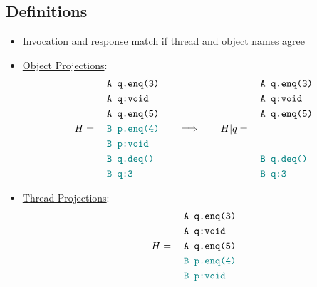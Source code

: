 \documentclass[twocolumn,landscape,10pt]{article}
\theoremstyle{definition}
\begin{document}
\subsection{Definitions}

\begin{itemize}
    \item Invocation and response \underline{match} if thread and object names
        agree
    \item \underline{Object Projections}:
        \[
            H = \quad\begin{align}
                &\texttt{A q.enq(3)} \\
                &\texttt{A q:void} \\
                &\texttt{A q.enq(5)} \\
                &\textcolor{teal}{\texttt{B p.enq(4)}} \\
                &\textcolor{teal}{\texttt{B p:void}} \\
                &\textcolor{teal}{\texttt{B q.deq()}} \\
                &\textcolor{teal}{\texttt{B q:3}} \\
            \end{align} 
            \qquad\Longrightarrow\qquad
            H|q = \quad\begin{align}
                &\texttt{A q.enq(3)} \\
                &\texttt{A q:void} \\
                &\texttt{A q.enq(5)} \\
                \\
                \\
                &\textcolor{teal}{\texttt{B q.deq()}} \\
                &\textcolor{teal}{\texttt{B q:3}} \\
            \end{align} 
        \]
    \item \underline{Thread Projections}:
        \[
            H = \quad\begin{align}
                &\texttt{A q.enq(3)} \\
                &\texttt{A q:void} \\
                &\texttt{A q.enq(5)} \\
                &\textcolor{teal}{\texttt{B p.enq(4)}} \\
                &\textcolor{teal}{\texttt{B p:void}} \\

\end{align}\]
\end{itemize}
\end{document}
